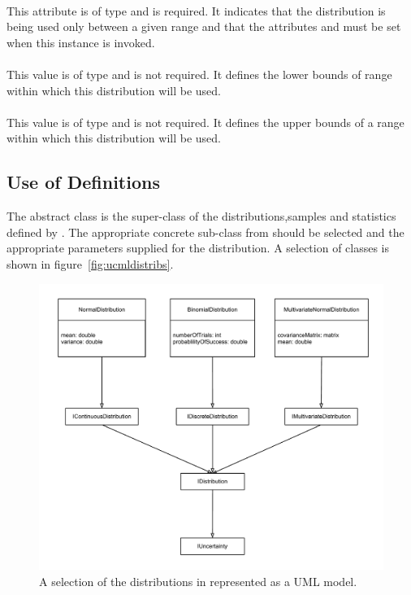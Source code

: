 \documentclass[draftspec]{sbmlpkgspec}
\begin{document}
\paragraph{}

This attribute is of type  and is required. It
indicates that the distribution is being used only between a given
range and that the attributes  and
 must be set when this instance is invoked.

\paragraph{}

This value is of type  and is not required. It
defines the lower bounds of range within which this distribution will
be used.

\paragraph{}

This value is of type  and is not required. It
defines the upper bounds of a range within which this distribution will
be used.

\subsection{Use of \uncertml Definitions}

The abstract class \unidistrib is the super-class of the
distributions,samples and statistics defined by \uncertml. The
appropriate concrete sub-class from \uncertml should be selected and
the appropriate parameters supplied for the distribution. A selection
of \uncertml classes is shown in figure~\vref{fig:ucmldistribs}.

\begin{figure}[htb]
\includegraphics[height=0.5\linewidth]{UncertMLDistributions.pdf}
\caption{A selection of the distributions in \uncertml represented as a UML model.}
\label{fig:ucmldistribs}
\end{figure}
\end{document}
